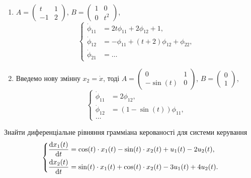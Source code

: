 \begin{solution}
	\begin{enumerate}
		\item $A = \begin{pmatrix} t & 1 \\ -1 & 2 \end{pmatrix}$, $B = \begin{pmatrix} 1 & 0 \\ 0 & t^2 \end{pmatrix}$, \[
		\left\{
			\begin{aligned}
				\dot \phi_{11} &= 2 t \phi_{11} + 2 \phi_{12} + 1, \\
				\dot \phi_{12} &= - \phi_{11} + (t + 2) \phi_{12} + \phi_{22}, \\
				\dot \phi_{21} &= \ldots 
			\end{aligned}
		\right.
		\]

		\item Введемо нову змінну $x_2 = \dot x$, тоді $A = \begin{pmatrix} 0 & 1 \\ -\sin(t) & 0 \end{pmatrix}$, $B = \begin{pmatrix} 0 \\ 1 \end{pmatrix}$, \[
		\left\{
			\begin{aligned}
				\dot \phi_{11} &= 2 \phi_{12}, \\
				\dot \phi_{12} &= (1 - \sin(t)) \phi_{11}, \\
				\ldots 
			\end{aligned}
		\right.
		\]
	\end{enumerate}
\end{solution}

\begin{problem}
 	Знайти диференціальне рівняння грамміана керованості для системи керування \[ \left\{ \begin{aligned}
 		\frac{\mathop{}\!\mathrm{d} x_1 (t)}{\mathop{}\!\mathrm{d} t} &= \cos(t) \cdot x_1(t)-\sin(t) \cdot x_2(t) + u_1(t) - 2 u_2(t), \\
 		\frac{\mathop{}\!\mathrm{d} x_2 (t)}{\mathop{}\!\mathrm{d} t} &= \sin(t) \cdot x_1(t)+\cos(t) \cdot x_2(t) - 3 u_1(t) + 4 u_2(t).
 	\end{aligned} \right. \]
\end{problem}

\begin{solution}
\end{solution}


